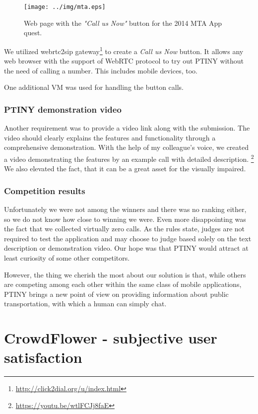 \begin{figure}[ht]
\centering
\texttt{[image: ../img/mta.eps]}
\caption{Web page with the \textit{"Call us Now"} button for the 2014 MTA App quest.}
\label{fig:mta}
\end{figure}

We utilized webrtc2sip gateway\footnote{\url{http://click2dial.org/u/index.html}} to create a \textit{Call us Now} button.
It allows any web browser with the support of WebRTC protocol to try out PTINY without the need of calling a number.
This includes mobile devices, too.

One additional VM was used for handling the button calls.

\subsubsection{PTINY demonstration video}

Another requirement was to provide a video link along with the submission.
The video should clearly explains the features and functionality through a comprehensive demonstration.
With the help of my colleague's voice, we created a video demonstrating the features by an example call with detailed description. \footnote{\url{https://youtu.be/wtlFCJj8faE}}
We also elevated the fact, that it can be a great asset for the visually impaired.

\subsubsection{Competition results}

Unfortunately we were not among the winners and there was no ranking either, so we do not know how close to winning we were.
Even more disappointing was the fact that we collected virtually zero calls.
As the rules state, judges are not required to test the application and may choose to judge based solely on the text description or demonstration video.
Our hope was that PTINY would attract at least curiosity of some other competitors.

However, the thing we cherish the most about our solution is that, while others are competing among each other within the same class of mobile applications, PTINY brings a new point of view on providing information about public transportation, with which a human can simply chat.


\section{CrowdFlower - subjective user satisfaction}

